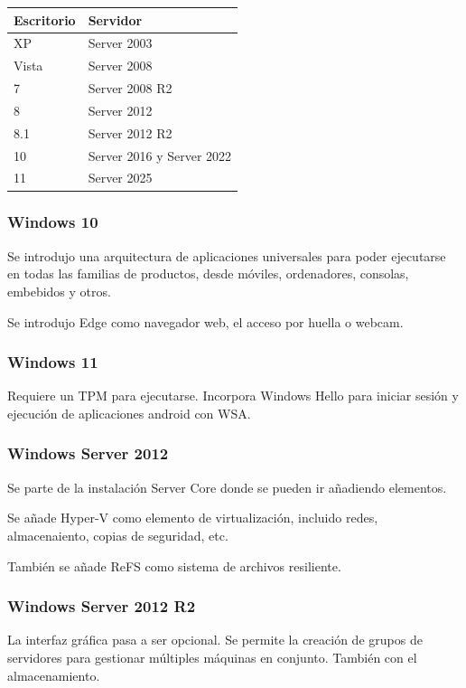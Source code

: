     \begin{table}[H]
    \begin{tabular}{ll}
        Escritorio & Servidor \\
        \midrule
        XP         & Server 2003 \\
        Vista      & Server 2008 \\
        7          & Server 2008 R2 \\
        8          & Server 2012 \\
        8.1        & Server 2012 R2 \\
        10         & Server 2016 y Server 2022 \\
        11         & Server 2025 \\
    \end{tabular}
    \end{table}
    \subsubsection{Windows 10}
        Se introdujo una arquitectura de aplicaciones universales para poder ejecutarse en todas las familias de productos, desde móviles, ordenadores, consolas, embebidos y otros.

        Se introdujo Edge como navegador web, el acceso por huella o webcam.

    \subsubsection{Windows 11}
        Requiere un TPM para ejecutarse. Incorpora Windows Hello para iniciar sesión y ejecución de aplicaciones android con WSA.

    \subsubsection{Windows Server 2012}
        Se parte de la instalación Server Core donde se pueden ir añadiendo elementos.

        Se añade Hyper-V como elemento de virtualización, incluido redes, almacenaiento, copias de seguridad, etc.

        También se añade ReFS como sistema de archivos resiliente.

    \subsubsection{Windows Server 2012 R2}
        La interfaz gráfica pasa a ser opcional. Se permite la creación de grupos de servidores para gestionar múltiples máquinas en conjunto. También con el almacenamiento.


